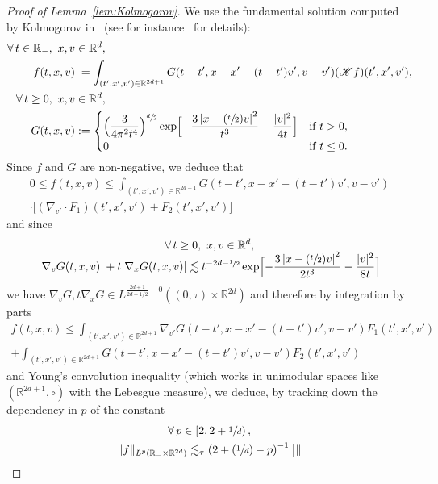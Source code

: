 \documentclass[JEP,XML,SOM,Unicode,NoFloatCountersInSection,published]{cedram}
\let\mathcal\mathscr
\newcommand{\Psfrac}[2]{(\sfrac{#1}{#2})}
\theoremstyle{definition}
\theoremstyle{remark}
\newcommand\R{{\mathbb R}}
\newcommand{\cK}{\mathcal K}
\begin{document}
\begin{proof}[Proof of Lemma~\ref{lem:Kolmogorov}]
We use the fundamental solution computed by Kolmogorov
in~\cite{kolmogorov} (see for
instance~\cite[App.\,A]{MR4113786} for details):
\begin{align*}
\forall \, t \in \R_-, \ x,v &\in \R^d, \\
f(t,x,v) &\phantom{:}=\int_{(t',x',v')\in \R^{2d+1}} G(t-t', x-x'
-(t-t')v',v-v') (\cK f)(t',x',v'), \\
\forall \, t \ge 0, \ x,v &\in \R^d, \\
G(t,x,v) &:=
\begin{dcases}
\Bigl( \frac{3}{4\pi^2 t^4} \Bigr)^{\sfrac{d}{2}}
\exp \Bigl[ - \frac{3 \left| x - \Psfrac{t}{2} v
\right|^2}{t^3} - \frac{|v|^2}{4t} \Bigr] & \text{if } t>0,\\
0 & \text{if } t\leq 0.
\end{dcases}
\end{align*}
Since $f$ and $G$ are non-negative, we deduce that
\begin{multline*}
0 \le f(t,x,v) \le\int_{(t',x',v')\in \R^{2d+1}} G(t-t', x-x'-(t-t')v',v-v')\\
\cdot\bigl[(\nabla_{v'} \cdot F_1) (t',x',v')+ F_2 (t',x',v') \bigr]
\end{multline*}
and since
\begin{multline*}
\forall \, t \ge 0, \ x,v \in \R^d, \\[-5pt]
|\nabla_v G(t,x,v)| +t |\nabla_x G(t,x,v)|
\lesssim t^{-2d-\sfrac12}
\exp \Bigl[ - \frac{3 \left| x - \Psfrac{t}{2} v
\right|^2}{2t^3} - \frac{|v|^2}{8t} \Bigr]
\end{multline*}
we have
$\nabla_v G, t \nabla_x G \in L^{\frac{2d+1}{2d+1/2}-0}
(\left(0,\tau\right) \times \R^{2d})$ and therefore by
integration by parts
\begin{multline*}
f(t,x,v) \le \int_{(t',x',v')\in \R^{2d+1}}
\nabla_{v'} G(t-t',x-x'-(t-t')v',v-v') F_1(t',x',v')\\
+ \int_{(t',x',v') \in \R^{2d+1}}
G(t-t',x-x'-(t-t')v',v-v') F_2(t',x',v')
\end{multline*}
and Young's convolution inequality (which works in unimodular
spaces like $(\R^{2d+1},\circ)$ with the Lebesgue measure), we
deduce, by tracking down the dependency in $p$ of the constant
\begin{multline*}
\forall \, p \in \left[2,2+\sfrac1d\right), \\
\| f \|_{L^{p}(\R_- \times \R^{2d})}\lesssim_\tau \left( 2+ \Psfrac1d - p \right)^{-1} \bigl[ \|

\end{multline*}
\end{proof}
\end{document}
